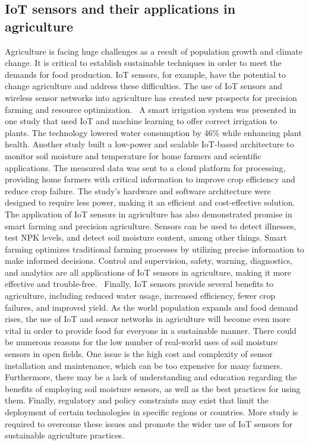 \documentclass[11pt]{scrartcl} %
\begin{document}
\subsection{IoT sensors and their applications in agriculture}
Agriculture is facing huge challenges as a result of population growth and climate change. It is critical to establish sustainable techniques in order to meet the demands for food production. IoT sensors, for example, have the potential to change agriculture and address these difficulties. The use of IoT sensors and wireless sensor networks into agriculture has created new prospects for precision farming and resource optimization.~\parencite{capacitive_sensors_for_irrigation_and_disease}
\newline A smart irrigation system was presented in one study that used IoT and machine learning to offer correct irrigation to plants. The technology lowered water consumption by 46\% while enhancing plant health. Another study built a low-power and scalable IoT-based architecture to monitor soil moisture and temperature for home farmers and scientific applications. The measured data was sent to a cloud platform for processing, providing home farmers with critical information to improve crop efficiency and reduce crop failure. The study's hardware and software architecture were designed to require less power, making it an efficient and cost-effective solution.~\parencites{precision_irrigation_iot}{capacitive_sensors_for_irrigation_and_disease}
\newline The application of IoT sensors in agriculture has also demonstrated promise in smart farming and precision agriculture. Sensors can be used to detect illnesses, test NPK levels, and detect soil moisture content, among other things. Smart farming optimizes traditional farming processes by utilizing precise information to make informed decisions. Control and supervision, safety, warning, diagnostics, and analytics are all applications of IoT sensors in agriculture, making it more effective and trouble-free.~\parencite{iot_and_sensors_in_agriculture_general}
\newline Finally, IoT sensors provide several benefits to agriculture, including reduced water usage, increased efficiency, fewer crop failures, and improved yield. As the world population expands and food demand rises, the use of IoT and sensor networks in agriculture will become even more vital in order to provide food for everyone in a sustainable manner.\parencite{capacitive_sensors_for_irrigation_and_disease,bwambale2022smart}
\newline There could be numerous reasons for the low number of real-world uses of soil moisture sensors in open fields. One issue is the high cost and complexity of sensor installation and maintenance, which can be too expensive for many farmers. Furthermore, there may be a lack of understanding and education regarding the benefits of employing soil moisture sensors, as well as the best practices for using them. Finally, regulatory and policy constraints may exist that limit the deployment of certain technologies in specific regions or countries. More study is required to overcome these issues and promote the wider use of IoT sensors for sustainable agriculture practices.
\end{document}
